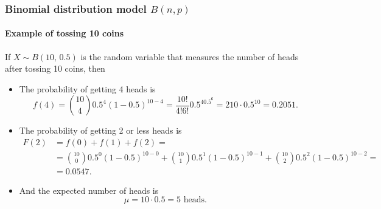 \begin{frame}
\frametitle{Binomial distribution model $B(n,p)$}
\framesubtitle{Example of tossing 10 coins}
If $X\sim B(10,\,0.5)$ is the random variable that measures the number of heads after tossing 10 coins, then
\begin{itemize}
\item The probability of getting 4 heads is 
\[
f(4) = \binom{10}{4}0.5^4 (1-0.5)^{10-4} = \frac{10!}{4!6!}0.5^40.5^6 = 210\cdot 0.5^{10} = 0.2051.
\]
\item The probability of getting 2 or less heads is
\begin{align*}
F(2) &= f(0) +f(1) + f(2) =\\
&= \binom{10}{0}0.5^0 (1-0.5)^{10-0} + \binom{10}{1}0.5^1 (1-0.5)^{10-1} + \binom{10}{2}0.5^2 (1-0.5)^{10-2} =\\
&= 0.0547.
\end{align*}
\item And the expected number of heads is
\[ \mu = 10\cdot 0.5 = 5 \mbox{ heads}.\]
\end{itemize}
\end{frame}


